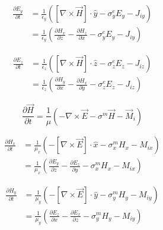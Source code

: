 \documentclass[10pt]{article}
\begin{document}
\begin{equation}
    \begin{aligned}
        \frac{\partial E_{y}}{\partial t} &= \frac{1}{\epsilon_{y}} \left( \left[ \nabla \times \vec{H} \right] \cdot \hat{y} - \sigma^{e}_{y} E_{y} - J_{iy} \right) \\
        & = \frac{1}{\epsilon_{y}} \left( \frac{\partial H_{x}}{\partial z} - \frac{\partial H_{z}}{\partial x} - \sigma^{e}_{y} E_{y} - J_{iy} \right)
    \end{aligned}
\end{equation}

\begin{equation}
    \begin{aligned}
        \frac{\partial E_{z}}{\partial t} &= \frac{1}{\epsilon_{z}} \left( \left[ \nabla \times \vec{H} \right] \cdot \hat{z} - \sigma^{e}_{z} E_{z} - J_{iz} \right) \\
        & = \frac{1}{\epsilon_{z}} \left( \frac{\partial H_{y}}{\partial x} - \frac{\partial H_{x}}{\partial y} - \sigma^{e}_{z} E_{z} - J_{iz} \right)
    \end{aligned}
\end{equation}



\begin{equation}
	\frac{\partial \vec{H}}{\partial t} =
	\frac{1}{\mu} \left( - \nabla \times \vec{E} - \sigma^{m} \vec{H} - \vec{M}_{i} \right)
\end{equation}

\begin{equation}
    \begin{aligned}
        \frac{\partial H_{x}}{\partial t} &= \frac{1}{\mu_{x}} \left( - \left[ \nabla \times \vec{E} \right] \cdot \hat{x} - \sigma^{m}_{x} H_{x} - M_{ix} \right) \\
        & = \frac{1}{\mu_{x}} \left( \frac{\partial E_{y}}{\partial z} - \frac{\partial E_{z}}{\partial y} - \sigma^{m}_{x} H_{x} - M_{ix} \right)
    \end{aligned}
\end{equation}

\begin{equation}
    \begin{aligned}
        \frac{\partial H_{y}}{\partial t} &= \frac{1}{\mu_{y}} \left( - \left[ \nabla \times \vec{E} \right] \cdot \hat{y} - \sigma^{m}_{y} H_{y} - M_{iy} \right) \\
        & = \frac{1}{\mu_{y}} \left( \frac{\partial E_{z}}{\partial x} - \frac{\partial E_{x}}{\partial z} - \sigma^{m}_{y} H_{y} - M_{iy} \right)
    \end{aligned}
\end{equation}
\end{document}
